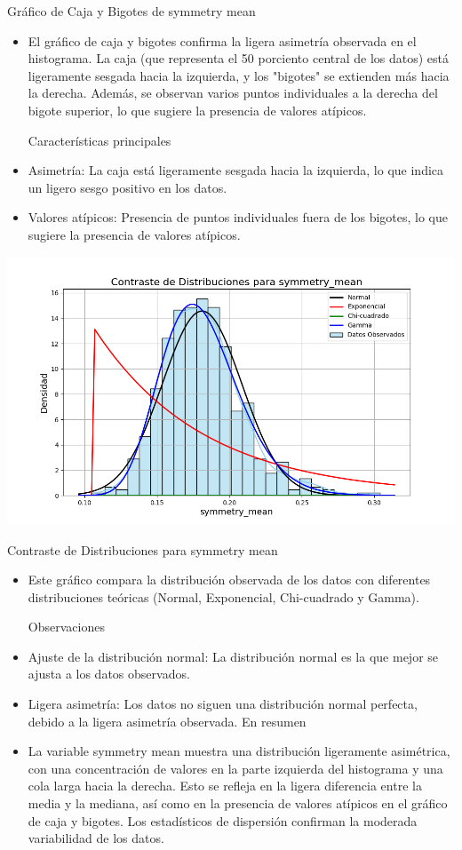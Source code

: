 \documentclass[a4paper, 12pt]{article}
\begin{document}
Gráfico de Caja y Bigotes de symmetry mean
\begin{itemize}
\item El gráfico de caja y bigotes confirma la ligera asimetría observada en el histograma. La caja (que representa el 50 porciento central de los datos) está ligeramente sesgada hacia la izquierda, y los "bigotes" se extienden más hacia la derecha. Además, se observan varios puntos individuales a la derecha del bigote superior, lo que sugiere la presencia de valores atípicos.

Características principales

\item Asimetría: La caja está ligeramente sesgada hacia la izquierda, lo que indica un ligero sesgo positivo en los datos.
\item Valores atípicos: Presencia de puntos individuales fuera de los bigotes, lo que sugiere la presencia de valores atípicos.
\end{itemize}


\includegraphics[width=\textwidth]{../Plots/plots_stats/symmetry_mean/distribuciones_conocidas_symmetry_mean.png}

Contraste de Distribuciones para symmetry mean
\begin{itemize}
\item Este gráfico compara la distribución observada de los datos con diferentes distribuciones teóricas (Normal, Exponencial, Chi-cuadrado y Gamma).

Observaciones

\item Ajuste de la distribución normal: La distribución normal es la que mejor se ajusta a los datos observados.
\item Ligera asimetría: Los datos no siguen una distribución normal perfecta, debido a la ligera asimetría observada.
En resumen
\item La variable symmetry mean muestra una distribución ligeramente asimétrica, con una concentración de valores en la parte izquierda del histograma y una cola larga hacia la derecha. Esto se refleja en la ligera diferencia entre la media y la mediana, así como en la presencia de valores atípicos en el gráfico de caja y bigotes. Los estadísticos de dispersión confirman la moderada variabilidad de los datos.
\end{itemize}
\end{document}
